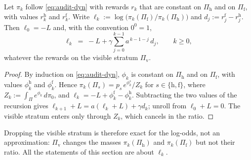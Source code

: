\begin{lemma}\label{lem:audit-logodds}
Let $\pi_k$ follow \eqref{eq:audit-dyn} with rewards $r_k$ that are constant
on $\Pi_{\mathrm h}$ and on $\Pi_{\mathrm f}$, with values $r_k^{\mathrm h}$
and $r_k^{\mathrm f}$. Write
$\ell_k:=\log\bigl(\pi_k(\Pi_{\mathrm f})/\pi_k(\Pi_{\mathrm h})\bigr)$ and
$d_j:=r_j^{\mathrm f}-r_j^{\mathrm h}$. Then $\ell_0=-L$ and, with the
convention $0^0=1$,
\begin{equation}\label{eq:audit-logodds}
  \ell_k \;=\; -L+\gamma\sum_{j=0}^{k-1}a^{\,k-1-j}\,d_j ,\qquad k\ge 0 ,
\end{equation}
whatever the rewards on the visible stratum $\Pi_{\mathrm v}$.
\end{lemma}
\begin{proof}
By induction on \eqref{eq:audit-dyn}, $\phi_k$ is constant on
$\Pi_{\mathrm h}$ and on $\Pi_{\mathrm f}$, with values $\phi_k^{\mathrm h}$
and $\phi_k^{\mathrm f}$. Hence
$\pi_k(\Pi_s)=p_s\,e^{\phi_k^{s}}/Z_k$ for $s\in\{\mathrm h,\mathrm f\}$,
where $Z_k:=\int_\Pi e^{\phi_k}\,d\pi_0$, and
$\ell_k=-L+\phi_k^{\mathrm f}-\phi_k^{\mathrm h}$. Subtracting the two values
of the recursion gives $\ell_{k+1}+L=a(\ell_k+L)+\gamma d_k$; unroll from
$\ell_0+L=0$. The visible stratum enters only through $Z_k$, which cancels in
the ratio.
\end{proof}

Dropping the visible stratum is therefore exact for the log-odds, not an
approximation: $\Pi_{\mathrm v}$ changes the masses $\pi_k(\Pi_{\mathrm h})$
and $\pi_k(\Pi_{\mathrm f})$ but not their ratio. All the statements of this
section are about $\ell_k$.

